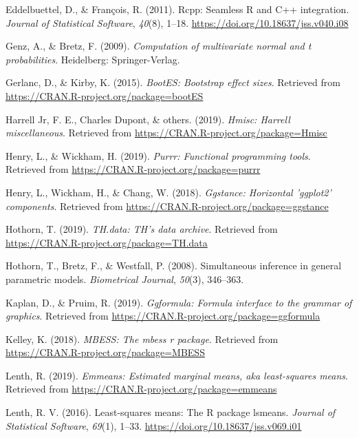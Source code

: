 \documentclass[
  english,
  man]{apa6}
\begin{document}
\leavevmode\hypertarget{ref-R-Rcpp_a}{}%
Eddelbuettel, D., \& François, R. (2011). Rcpp: Seamless R and C++ integration. \emph{Journal of Statistical Software}, \emph{40}(8), 1--18. \url{https://doi.org/10.18637/jss.v040.i08}

\leavevmode\hypertarget{ref-R-mvtnorm}{}%
Genz, A., \& Bretz, F. (2009). \emph{Computation of multivariate normal and t probabilities}. Heidelberg: Springer-Verlag.

\leavevmode\hypertarget{ref-R-bootES}{}%
Gerlanc, D., \& Kirby, K. (2015). \emph{BootES: Bootstrap effect sizes}. Retrieved from \url{https://CRAN.R-project.org/package=bootES}

\leavevmode\hypertarget{ref-R-Hmisc}{}%
Harrell Jr, F. E., Charles Dupont, \& others. (2019). \emph{Hmisc: Harrell miscellaneous}. Retrieved from \url{https://CRAN.R-project.org/package=Hmisc}

\leavevmode\hypertarget{ref-R-purrr}{}%
Henry, L., \& Wickham, H. (2019). \emph{Purrr: Functional programming tools}. Retrieved from \url{https://CRAN.R-project.org/package=purrr}

\leavevmode\hypertarget{ref-R-ggstance}{}%
Henry, L., Wickham, H., \& Chang, W. (2018). \emph{Ggstance: Horizontal 'ggplot2' components}. Retrieved from \url{https://CRAN.R-project.org/package=ggstance}

\leavevmode\hypertarget{ref-R-TH.data}{}%
Hothorn, T. (2019). \emph{TH.data: TH's data archive}. Retrieved from \url{https://CRAN.R-project.org/package=TH.data}

\leavevmode\hypertarget{ref-R-multcomp}{}%
Hothorn, T., Bretz, F., \& Westfall, P. (2008). Simultaneous inference in general parametric models. \emph{Biometrical Journal}, \emph{50}(3), 346--363.

\leavevmode\hypertarget{ref-R-ggformula}{}%
Kaplan, D., \& Pruim, R. (2019). \emph{Ggformula: Formula interface to the grammar of graphics}. Retrieved from \url{https://CRAN.R-project.org/package=ggformula}

\leavevmode\hypertarget{ref-R-MBESS}{}%
Kelley, K. (2018). \emph{MBESS: The mbess r package}. Retrieved from \url{https://CRAN.R-project.org/package=MBESS}

\leavevmode\hypertarget{ref-R-emmeans}{}%
Lenth, R. (2019). \emph{Emmeans: Estimated marginal means, aka least-squares means}. Retrieved from \url{https://CRAN.R-project.org/package=emmeans}

\leavevmode\hypertarget{ref-R-lsmeans}{}%
Lenth, R. V. (2016). Least-squares means: The R package lsmeans. \emph{Journal of Statistical Software}, \emph{69}(1), 1--33. \url{https://doi.org/10.18637/jss.v069.i01}
\end{document}
